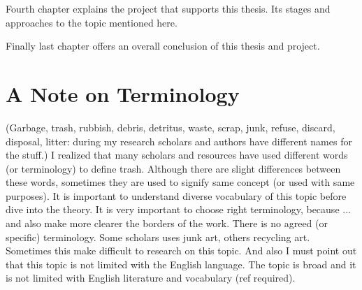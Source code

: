 Fourth chapter explains the project that supports this thesis. Its stages and approaches to the topic mentioned here.


Finally last chapter offers an overall conclusion of this thesis and project. 


\section{A Note on Terminology}
(Garbage, trash, rubbish, debris, detritus, waste, scrap, junk, refuse, discard, disposal, litter: during my research scholars and authors have different names for the stuff.) I realized that many scholars and resources have used different words (or terminology) to define trash. Although there are slight differences between these words, sometimes they are used to signify same concept (or used with same purposes). It is important to understand diverse vocabulary of this topic before dive into the theory. It is very important to choose right terminology, because ... and also make more clearer the borders of the work. There is no agreed (or specific) terminology. Some scholars uses junk art, others recycling art. Sometimes this make difficult to research on this topic. And also I must point out that this topic is not limited with the English language. The topic is broad and it is not limited with English literature and vocabulary (ref required). 


